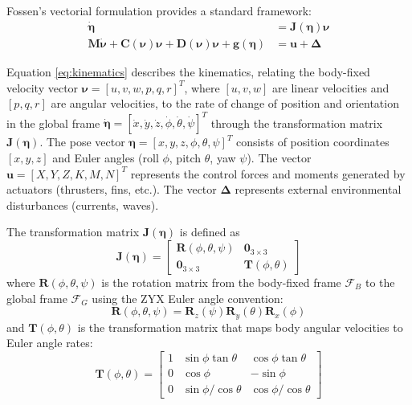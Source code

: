 Fossen's vectorial formulation provides a standard framework:
\begin{align}
    \dot{\boldsymbol{\eta}} &= \mathbf{J}(\boldsymbol{\eta})\boldsymbol{\nu} \label{eq:kinematics} \\
    \mathbf{M}\dot{\boldsymbol{\nu}} + \mathbf{C}(\boldsymbol{\nu})\boldsymbol{\nu} + \mathbf{D}(\boldsymbol{\nu})\boldsymbol{\nu} + \mathbf{g}(\boldsymbol{\eta}) &= \mathbf{u} + \boldsymbol{\Delta} \label{eq:dynamics}
\end{align}

Equation \eqref{eq:kinematics} describes the kinematics, relating the body-fixed velocity vector $\boldsymbol{\nu} = [u, v, w, p, q, r]^T$, where $[u, v, w]$ are linear velocities and $[p, q, r]$ are angular velocities, to the rate of change of position and orientation in the global frame $\dot{\boldsymbol{\eta}} = [\dot{x}, \dot{y}, \dot{z}, \dot{\phi}, \dot{\theta}, \dot{\psi}]^T$ through the transformation matrix $\mathbf{J}(\boldsymbol{\eta})$. The pose vector $\boldsymbol{\eta} = [x, y, z, \phi, \theta, \psi]^T$ consists of position coordinates $[x, y, z]$ and Euler angles (roll $\phi$, pitch $\theta$, yaw $\psi$). The vector $\mathbf{u} = [X, Y, Z, K, M, N]^T$ represents the control forces and moments generated by actuators (thrusters, fins, etc.). The vector $\boldsymbol{\Delta}$ represents external environmental disturbances (currents, waves).

The transformation matrix $\mathbf{J}(\boldsymbol{\eta})$ is defined as
\begin{equation}
    \mathbf{J}(\boldsymbol{\eta}) =
    \begin{bmatrix}
        \mathbf{R}(\phi,\theta,\psi) & \mathbf{0}_{3\times3} \\
        \mathbf{0}_{3\times3} & \mathbf{T}(\phi,\theta)
    \end{bmatrix}
\end{equation}
where $\mathbf{R}(\phi,\theta,\psi)$ is the rotation matrix from the body-fixed frame $\mathcal{F}_B$ to the global frame $\mathcal{F}_G$ using the ZYX Euler angle convention:
\begin{equation}
    \mathbf{R}(\phi,\theta,\psi) = \mathbf{R}_z(\psi)\mathbf{R}_y(\theta)\mathbf{R}_x(\phi)
\end{equation}
and $\mathbf{T}(\phi,\theta)$ is the transformation matrix that maps body angular velocities to Euler angle rates:
\begin{equation}
    \mathbf{T}(\phi,\theta) =
    \begin{bmatrix}
        1 & \sin\phi \tan\theta & \cos\phi \tan\theta \\
        0 & \cos\phi & -\sin\phi \\
        0 & \sin\phi / \cos\theta & \cos\phi / \cos\theta
    \end{bmatrix}
\end{equation}

